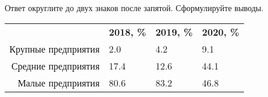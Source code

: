 \documentclass{article}
\begin{document}
Ответ округлите до двух знаков после запятой. Сформулируйте выводы.\\

\begin{minipage}{\textwidth}
\centering
\begin{tabularx}{0.8\textwidth}{rYYY}
\toprule
 & \textbf{2018, \%} & \textbf{2019, \%} & \textbf{2020, \%} \\
\cmidrule(lr){2-2}\cmidrule(lr){3-3}\cmidrule(lr){4-4}
Крупные предприятия & 2.0 & 4.2 & 9.1 \\

Средние предприятия & 17.4 & 12.6 & 44.1 \\

Малые предприятия & 80.6 & 83.2 & 46.8 \\
\bottomrule
\end{tabularx}
\label{task2}
\end{minipage} \\[35pt]
\end{document}
